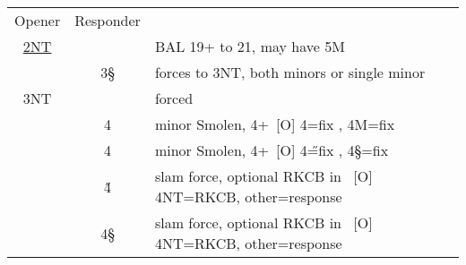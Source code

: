 \hypertarget{2n3s3n}{}
\begin{longtable}{C{\bidlength} C{\bidlength} | l}
Opener & Responder \\
\hyperlink{2n}{2NT} & & BAL 19+ to 21, may have 5M \\
& 3\S & forces to 3NT, both minors or single minor \\
3NT & & forced \\
\hline\hline
& 4\C & minor Smolen, 4+\D\ [O] 4\D=fix \D, 4M=fix \C \\
& 4\D & minor Smolen, 4+\C\ [O] 4\H=fix \C, 4\S=fix \D \\
& 4\H & slam force, optional RKCB in \C\ [O] 4NT=RKCB, other=response \\
& 4\S & slam force, optional RKCB in \D\ [O] 4NT=RKCB, other=response \\
\end{longtable}
